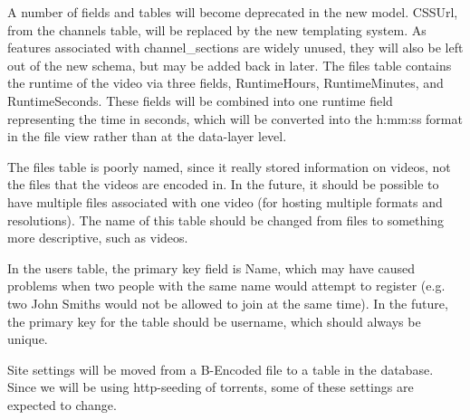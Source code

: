 \documentclass[a4paper,12pt]{report}
\begin{document}
A number of fields and tables will become deprecated in the new model. CSSUrl, from the channels table, will be replaced by the new templating system. As features associated with channel\_sections are widely unused, they will also be left out of the new schema, but may be added back in later. The files table contains the runtime of the video via three fields, RuntimeHours, RuntimeMinutes, and RuntimeSeconds. These fields will be combined into one runtime field representing the time in seconds, which will be converted into the h:mm:ss format in the file view rather than at the data-layer level.


The files table is poorly named, since it really stored information on videos, not the files that the videos are encoded in. In the future, it should be possible to have multiple files associated with one video (for hosting multiple formats and resolutions). The name of this table should be changed from files to something more descriptive, such as videos.


In the users table, the primary key field is Name, which may have caused problems when two people with the same name would attempt to register (e.g. two John Smiths would not be allowed to join at the same time). In the future, the primary key for the table should be username, which should always be unique.


Site settings will be moved from a B-Encoded file to a table in the database. Since we will be using http-seeding of torrents, some of these settings are expected to change.
\end{document}
